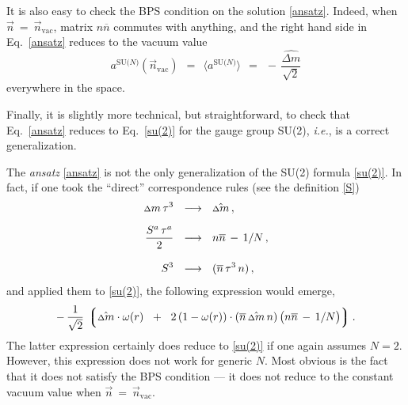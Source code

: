 \documentclass[12pt]{article}
\def\beq{\begin{equation}}
\def\eeq{\end{equation}}
\newcommand{\ov}{\overline}
\newcommand{\lgr}{\left\lgroup}
\newcommand{\rgr}{\right\rgroup}
\newcommand{\aN}{a^\text{SU($N$)}}
\newcommand{\nbar}{\ov{n}}
\newcommand{\nnbar}{n\ov{n}}
\newcommand{\dm}{\hat{{\scriptstyle \Delta} m}}
\newcommand{\deltam}{{\scriptstyle \Delta} m}
\newcommand{\nvac}{\vec{n}{}_\text{vac}}
\newcommand{\ansatz}{{\it ansatz} }
\begin{document}
	It is also easy to check the BPS condition on the solution \eqref{ansatz}.
	Indeed, when $ \vec{n} ~=~ \nvac $, matrix $ \nnbar $ commutes with anything,
	and the right hand side in Eq.~\eqref{ansatz} reduces to the vacuum value
\beq
	\aN (\nvac)    ~~=~~    \langle \aN \rangle    ~~=~~    -\, \frac{\dm}{\sqrt{2}}
\eeq
	everywhere in the space.

	Finally, it is slightly more technical, but straightforward, to check that Eq.~\eqref{ansatz}
	reduces to Eq.~\eqref{su(2)} for the gauge group SU(2), {\it i.e.}, is a correct generalization.

	The \ansatz \eqref{ansatz} is not the only generalization of the SU(2) formula \eqref{su(2)}.
	In fact, if one took the ``direct'' correspondence rules (see the definition \eqref{S})
\begin{align}
%
\notag
	\deltam\, \tau^3    & ~~\longrightarrow~~    \dm\,,\\[2mm]
%
	\frac{S^a\, \tau^a}{2}    & ~~\longrightarrow~~    \nnbar \,-\, 1/N \,,\\[3mm]
%
\notag
	S^3    & ~~\longrightarrow~~     (\nbar\, \tau^3\, n)\,,
\end{align}
	and applied them to \eqref{su(2)}, the following expression would emerge,
\[
	-\, \frac{1}{\sqrt{2}}\, \lgr  \dm \cdot \omega(r)  \;~+~\;  
	2\, ( 1 - \omega(r) ) \cdot (\nbar\, \dm\, n) \, \big( \nnbar \,-\, 1/N \big) \rgr.
\]
	The latter expression certainly does reduce to \eqref{su(2)} if one  again assumes $ N = 2 $.
	However, this expression does not work for generic $N$.
	Most obvious is the fact that it does not satisfy the BPS condition ---
	it does not reduce to the constant vacuum value when $ \vec{n} ~=~ \nvac $.
\end{document}
